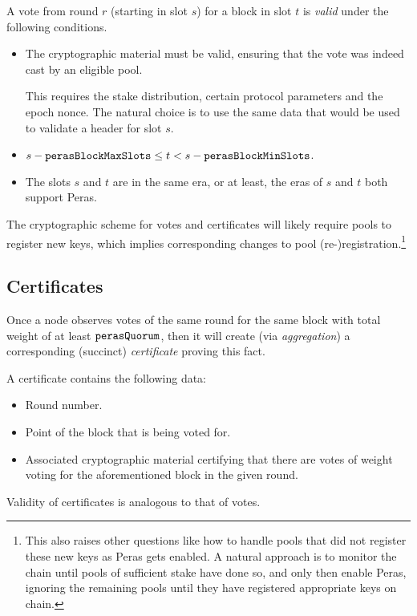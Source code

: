 A vote from round $r$ (starting in slot $s$) for a block in slot $t$ is \emph{valid} under the following conditions.
\begin{itemize}
\item
  The cryptographic material must be valid, ensuring that the vote was indeed cast by an eligible pool.

  This requires the stake distribution, certain protocol parameters and the epoch nonce.
  The natural choice is to use the same data that would be used to validate a header for slot $s$.
\item
  $s - \mathtt{perasBlockMaxSlots} \le t < s - \mathtt{perasBlockMinSlots}$.
\item
  The slots $s$ and $t$ are in the same era, or at least, the eras of $s$ and $t$ both support Peras.
\end{itemize}

The cryptographic scheme for votes and certificates \parencite{peras-cert-report} will likely require pools to register new keys, which implies corresponding changes to pool (re-)registration.\footnote{
  This also raises other questions like how to handle pools that did not register these new keys as Peras gets enabled.
  A natural approach is to monitor the chain until pools of sufficient stake have done so, and only then enable Peras, ignoring the remaining pools until they have registered appropriate keys on chain.}

\subsection{Certificates}\label{sec:certificate generalities}

Once a node observes votes of the same round for the same block with total weight of at least $\mathtt{perasQuorum}$, then it will create (via \emph{aggregation}) a corresponding (succinct) \emph{certificate} proving this fact.

A certificate contains the following data:
\begin{itemize}
\item Round number.
\item Point of the block that is being voted for.
\item Associated cryptographic material certifying that there are votes of weight \perasQuorum{} voting for the aforementioned block in the given round.
\end{itemize}

Validity of certificates is analogous to that of votes.


